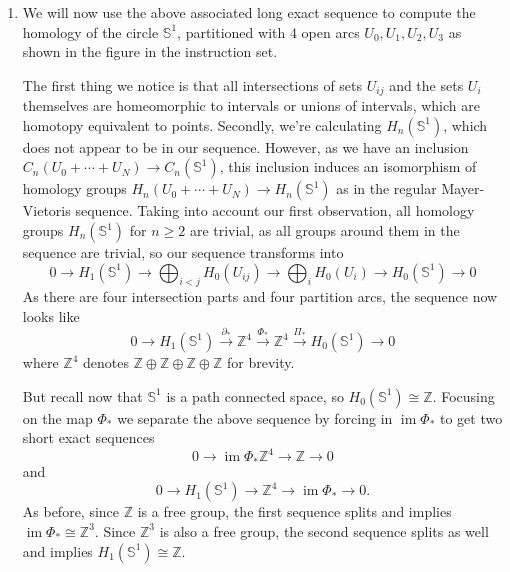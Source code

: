 \documentclass[a4paper, 12pt]{article}
\DeclareMathOperator{\im}{im}
\renewcommand{\S}{\mathbb{S}}
\newcommand{\Z}{\mathbb{Z}}
\newcommand{\iso}{\cong}
\begin{document}
\begin{enumerate}
	\item We will now use the above associated long exact sequence to compute the homology of the circle $\S^1$, partitioned with $4$ open arcs $U_0, U_1, U_2, U_3$ as shown in the figure in the instruction set.
	
	The first thing we notice is that all intersections of sets $U_{ij}$ and the sets $U_i$ themselves are homeomorphic to intervals or unions of intervals, which are homotopy equivalent to points. Secondly, we're calculating $H_n(\S^1)$, which does not appear to be in our sequence. However, as we have an inclusion $C_n(U_0 + \cdots + U_N) \to C_n(\S^1)$, this inclusion induces an isomorphism of homology groups $H_n(U_0 + \cdots + U_N) \to H_n(\S^1)$ as in the regular Mayer-Vietoris sequence. Taking into account our first observation, all homology groups $H_n(\S^1)$ for $n\geq 2$ are trivial, as all groups around them in the sequence are trivial, so our sequence transforms into
	\[
	0 \xrightarrow{} H_1(\S^1) \xrightarrow{} \bigoplus_{i<j}H_0(U_{ij}) \xrightarrow{} \bigoplus_{i}H_0(U_i) \xrightarrow{} H_0(\S^1) \xrightarrow{} 0
	\]
	As there are four intersection parts and four partition arcs,
	the sequence now looks like
	\[
	0 \xrightarrow{} H_1(\S^1) \xrightarrow{\partial_*} \Z^4 \xrightarrow{\Phi_*} \Z^4 \xrightarrow{\Pi_*} H_0(\S^1) \xrightarrow{} 0
	\]
	where $\Z^4$ denotes $\Z\oplus\Z\oplus\Z\oplus\Z$ for brevity.
	
	But recall now that $\S^1$ is a path connected space, so $H_0(\S^1) \iso \Z$. Focusing on the map $\Phi_*$ we separate the above sequence by forcing in $\im\Phi_*$ to get two short exact sequences
	\[
	0 \xrightarrow{} \im\Phi_* \Z^4 \xrightarrow{} \Z \xrightarrow{} 0
	\]
	and
	\[
	0 \xrightarrow{} H_1(\S^1) \xrightarrow{} \Z^4 \xrightarrow{} \im\Phi_* \xrightarrow{} 0.
	\]
	As before, since $\Z$ is a free group, the first sequence splits and implies $\im\Phi_* \iso \Z^3$. Since $\Z^3$ is also a free group, the second sequence splits as well and implies $H_1(\S^1) \iso \Z$.
	

\end{enumerate}
\end{document}
